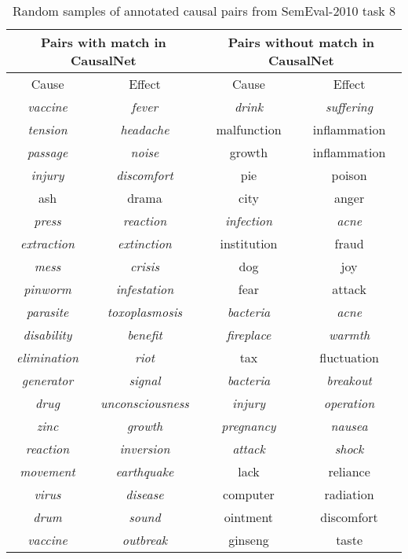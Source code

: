 \begin{table}[th]
\centering
\caption{Random samples of annotated causal pairs from SemEval-2010 task 8}
\label{tab:sample}
\small
\begin{tabular}{|c c | c c |}
\hline \multicolumn{2}{|c|}{Pairs with match in CausalNet} &
\multicolumn{2}{c|}{Pairs without match in CausalNet}\\
\hline \hline
\multicolumn{1}{|c}{Cause} & \multicolumn{1}{c|}{Effect} & \multicolumn{1}{|c}{Cause} & \multicolumn{1}{c|}{Effect} \\
\hline

\emph{vaccine} & \emph{fever}    & \emph{drink} & \emph{suffering} \\
\emph{tension} & \emph{headache}     & malfunction & inflammation\\
\emph{passage} & \emph{noise}    & growth & inflammation\\
\emph{injury} & \emph{discomfort}    & pie & poison\\
ash & drama  & city & anger\\
\emph{press} & \emph{reaction}   & \emph{infection} & \emph{acne}\\
\emph{extraction} & \emph{extinction}    & institution & fraud\\
\emph{mess} & \emph{crisis}  & dog & joy\\
\emph{pinworm} & \emph{infestation}  & fear & attack\\
\emph{parasite} & \emph{toxoplasmosis}   & \emph{bacteria} & \emph{acne}\\
\emph{disability} & \emph{benefit}   & \emph{fireplace} & \emph{warmth}\\
\emph{elimination} & \emph{riot}     & tax & fluctuation\\
\emph{generator} & \emph{signal}     & \emph{bacteria} & \emph{breakout}\\
\emph{drug} & \emph{unconsciousness}     & \emph{injury} & \emph{operation}\\
\emph{zinc} & \emph{growth}  & \emph{pregnancy} & \emph{nausea}\\
\emph{reaction} & \emph{inversion}   & \emph{attack} & \emph{shock}\\
\emph{movement} & \emph{earthquake}  & lack & reliance\\
\emph{virus} & \emph{disease}    & computer & radiation\\
\emph{drum} & \emph{sound}   & ointment & discomfort\\
\emph{vaccine} & \emph{outbreak}     & ginseng & taste\\
\hline
\end{tabular}
\end{table}

